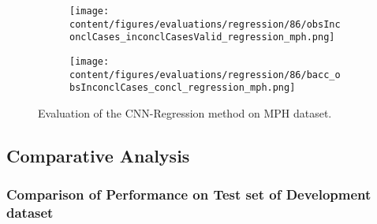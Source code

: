 \begin{figure}[ht]
  \begin{subfigure}{0.9\textwidth}
    \centering
    \texttt{[image: content/figures/evaluations/regression/86/obsInconclCases\_inconclCasesValid\_regression\_mph.png]}
    \label{fig:obsInconclCases_inconclCasesValid_regression_mph}
  \end{subfigure}
  \hfill
  \begin{subfigure}{0.9\textwidth}
    \centering
    \texttt{[image: content/figures/evaluations/regression/86/bacc\_obsInconclCases\_concl\_regression\_mph.png]}
    \label{fig:bacc_obsInconclCases_concl_regression_mph}
  \end{subfigure}
  \caption{Evaluation of the CNN-Regression method on MPH dataset.}
  \label{fig:perf_regression_mph}
\end{figure}


\subsection{Comparative Analysis}
\label{subsec:compar_anal}


\subsubsection{Comparison of Performance on Test set of Development dataset}
\label{subsubsec:perf_comp_dev}


